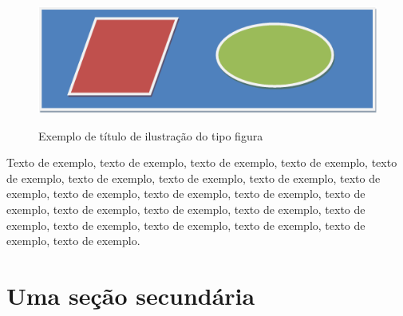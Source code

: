 \documentclass[
	12pt,				%
	oneside,			%
	a4paper,			%
	english,			%
	brazil				%
	]{abntex2ppgsi}
\begin{document}
% 
%
%
%
%
\begin{figure}[H]%
	\centering
 	  \caption{Exemplo de título de ilustração do tipo figura}
		\includegraphics{figuras/figura-exemplo.png}
	\label{fig:figura-exemplo1}
\end{figure}

Texto de exemplo, texto de exemplo, texto de exemplo, texto de exemplo, texto de exemplo, texto de exemplo, texto de exemplo, texto de exemplo, texto de exemplo, texto de exemplo, texto de exemplo, texto de exemplo, texto de exemplo, texto de exemplo, texto de exemplo, texto de exemplo, texto de exemplo, texto de exemplo, texto de exemplo, texto de exemplo, texto de exemplo, texto de exemplo.

\section{Uma seção secundária}
 
\end{document}
